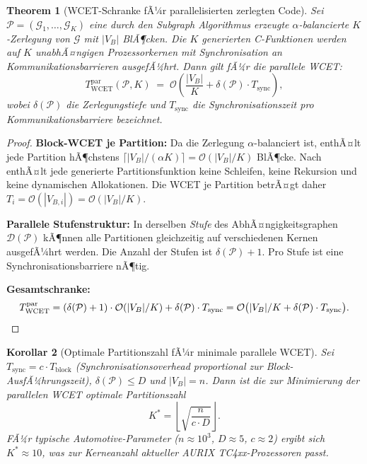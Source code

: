 ﻿\documentclass[12pt,a4paper]{article}
\newtheorem{theorem}{Theorem}[section]
\newtheorem{korollar}[theorem]{Korollar}
\theoremstyle{definition}
\begin{document}
\begin{theorem}[WCET-Schranke fÃ¼r parallelisierten zerlegten Code]
\label{thm:subgraph-wcet}
Sei $\mathcal{P} = (\mathcal{G}_1, \ldots, \mathcal{G}_K)$ eine durch den
Subgraph Algorithmus erzeugte $\alpha$-balancierte $K$-Zerlegung von
$\mathcal{G}$ mit $|V_B|$ BlÃ¶cken. Die $K$ generierten C-Funktionen
werden auf $K$ unabhÃ¤ngigen Prozessorkernen mit Synchronisation an
Kommunikationsbarrieren ausgefÃ¼hrt. Dann gilt fÃ¼r die parallele WCET:
\[
  T_{\mathrm{WCET}}^{\mathrm{par}}(\mathcal{P}, K)
  \;=\; \mathcal{O}\!\left(
    \frac{|V_B|}{K} + \delta(\mathcal{P}) \cdot T_{\mathrm{sync}}
  \right),
\]
wobei $\delta(\mathcal{P})$ die Zerlegungstiefe und $T_{\mathrm{sync}}$
die Synchronisationszeit pro Kommunikationsbarriere bezeichnet.
\end{theorem}

\begin{proof}
\textbf{Block-WCET je Partition:}
Da die Zerlegung $\alpha$-balanciert ist, enthÃ¤lt jede Partition hÃ¶chstens
$\lceil |V_B| / (\alpha K) \rceil = \mathcal{O}(|V_B|/K)$ BlÃ¶cke.
Nach  enthÃ¤lt jede generierte Partitionsfunktion keine
Schleifen, keine Rekursion und keine dynamischen Allokationen.
Die WCET je Partition betrÃ¤gt daher
$T_i = \mathcal{O}(|V_{B,i}|) = \mathcal{O}(|V_B|/K)$.

\textbf{Parallele Stufenstruktur:}
In derselben \emph{Stufe} des AbhÃ¤ngigkeitsgraphen $\mathcal{D}(\mathcal{P})$
kÃ¶nnen alle Partitionen gleichzeitig auf verschiedenen Kernen ausgefÃ¼hrt
werden. Die Anzahl der Stufen ist $\delta(\mathcal{P}) + 1$.
Pro Stufe ist eine Synchronisationsbarriere nÃ¶tig.

\textbf{Gesamtschranke:}
\[
  T_{\mathrm{WCET}}^{\mathrm{par}}
  = (\delta(\mathcal{P}) + 1) \cdot \mathcal{O}(|V_B|/K)
    + \delta(\mathcal{P}) \cdot T_{\mathrm{sync}}
  = \mathcal{O}\bigl(|V_B|/K + \delta(\mathcal{P}) \cdot T_{\mathrm{sync}}\bigr).
  \qedhere
\]
\end{proof}

\begin{korollar}[Optimale Partitionszahl fÃ¼r minimale parallele WCET]
\label{kor:optimal-K}
Sei $T_{\mathrm{sync}} = c \cdot T_{\mathrm{block}}$
(Synchronisationsoverhead proportional zur Block-AusfÃ¼hrungszeit),
$\delta(\mathcal{P}) \leq D$ und $|V_B| = n$. Dann ist die zur
Minimierung der parallelen WCET optimale Partitionszahl
\[
  K^* = \left\lfloor\sqrt{\frac{n}{c \cdot D}}\right\rfloor.
\]
FÃ¼r typische Automotive-Parameter ($n \approx 10^3$, $D \approx 5$,
$c \approx 2$) ergibt sich $K^* \approx 10$, was zur Kerneanzahl
aktueller AURIX TC4xx-Prozessoren passt.
\end{korollar}
\end{document}
